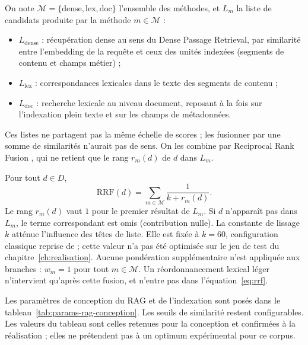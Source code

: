 On note $\mathcal{M} = \{\mathrm{dense}, \mathrm{lex}, \mathrm{doc}\}$ l'ensemble des méthodes, et $L_{m}$ la liste de candidats produite par la méthode $m \in \mathcal{M}$ :
\begin{itemize}
  \item $L_{\mathrm{dense}}$ : récupération dense au sens du Dense Passage Retrieval, par similarité entre l'embedding de la requête et ceux des unités indexées (segments de contenu et champs métier)  ;
  \item $L_{\mathrm{lex}}$ : correspondances lexicales dans le texte des segments de contenu ;
  \item $L_{\mathrm{doc}}$ : recherche lexicale au niveau document, reposant à la fois sur l'indexation plein texte et sur les champs de métadonnées.
\end{itemize}
Ces listes ne partagent pas la même échelle de scores ; les fusionner par une somme de similarités n'aurait pas de sens. On les combine par Reciprocal Rank Fusion , qui ne retient que le rang $r_{m}(d)$ de $d$ dans $L_{m}$.

Pour tout $d \in D$,
\begin{equation}
\label{eq:rrf}
\mathrm{RRF}(d) = \sum_{m \in \mathcal{M}} \frac{1}{k + r_{m}(d)}.
\end{equation}
Le rang $r_{m}(d)$ vaut $1$ pour le premier résultat de $L_{m}$. Si $d$ n'apparaît pas dans $L_{m}$, le terme correspondant est omis (contribution nulle). La constante de lissage $k$ atténue l'influence des têtes de liste. Elle est fixée à $k = 60$, configuration classique reprise de  ; cette valeur n'a pas été optimisée sur le jeu de test du chapitre~\ref{ch:realisation}. Aucune pondération supplémentaire n'est appliquée aux branches : $w_{m} = 1$ pour tout $m \in \mathcal{M}$. Un réordonnancement lexical léger n'intervient qu'après cette fusion, et n'entre pas dans l'équation~\eqref{eq:rrf}.

Les paramètres de conception du RAG et de l'indexation sont posés dans le tableau~\ref{tab:params-rag-conception}. Les seuils de similarité restent configurables. Les valeurs du tableau sont celles retenues pour la conception et confirmées à la réalisation ; elles ne prétendent pas à un optimum expérimental pour ce corpus.

